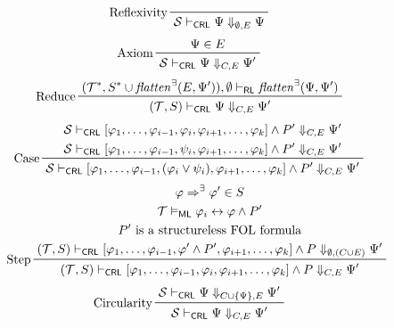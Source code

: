 \begin{figure}
    \centering
    \begin{align*}
    & \prftree[l]{Reflexivity}{\mathcal{S} \vdash_\CRL \Psi \Downarrow_{\emptyset,E} \Psi}
    \end{align*}
    \begin{align*}
    & \prftree[l]{Axiom}{\Psi \in E}{\mathcal{S} \vdash_\CRL \Psi \Downarrow_{C,E} \Psi^\prime}
    \end{align*}
    \begin{align*}
    & \prftree[l]{Reduce}
      {(\mathcal{T}^*, S^* \cup \mathit{flatten}^\exists(E, \Psi^\prime)), \emptyset \vdash_\RL
        \mathit{flatten}^\exists(\Psi, \Psi^\prime) }
      {(\mathcal{T}, S) \vdash_\CRL \Psi \Downarrow_{C,E} \Psi^\prime}
    \end{align*}
    \begin{align*}
    & \prftree[l]{Case}
    { \prfStackPremises
      {\mathcal{S} \vdash_\CRL [\varphi_1, \ldots, \varphi_{i-1}, \varphi_i, \varphi_{i+1}, \ldots, \varphi_k] \land P^\prime \Downarrow_{C, E} \Psi^\prime }
      {\mathcal{S} \vdash_\CRL [\varphi_1, \ldots, \varphi_{i-1}, \psi_i, \varphi_{i+1}, \ldots, \varphi_k] \land P^\prime \Downarrow_{C, E} \Psi^\prime }
    }
    {\mathcal{S} \vdash_\CRL [\varphi_1, \ldots, \varphi_{i-1}, (\varphi_i \lor \psi_i), \varphi_{i+1}, \ldots, \varphi_k] \land P^\prime \Downarrow_{C, E} \Psi^\prime}
    \end{align*}
    \begin{align*}
    & \prftree[l]{Step}
    { \prfStackPremises
       {\varphi \Rightarrow^\exists \varphi^\prime \in S}
       {\mathcal{T} \vDash_\ML \varphi_i \leftrightarrow \varphi \land P^\prime}
       {P^\prime \mbox{ is a structureless FOL formula}}
       {  (\mathcal{T}, S) \vdash_\CRL [\varphi_1, \ldots, \varphi_{i-1}, \varphi^\prime \land P^\prime, \varphi_{i+1}, \ldots, \varphi_k]
          \land P
          \Downarrow_{\emptyset, (C \cup E)} \Psi^\prime
      }
    }
    {(\mathcal{T}, S) \vdash_\CRL [\varphi_1, \ldots, \varphi_{i-1}, \varphi_i, \varphi_{i+1}, \ldots, \varphi_k] \land P \Downarrow_{C, E} \Psi^\prime}
    \end{align*}
    \begin{align*}
    & \prftree[l]{Circularity}
      { \mathcal{S} \vdash_\CRL \Psi \Downarrow_{C \cup \{ \Psi \} , E} \Psi^\prime}
      { \mathcal{S} \vdash_\CRL \Psi \Downarrow_{C, E} \Psi^\prime}
    \end{align*}
    \begin{align*}

\end{align*}
\end{figure}
